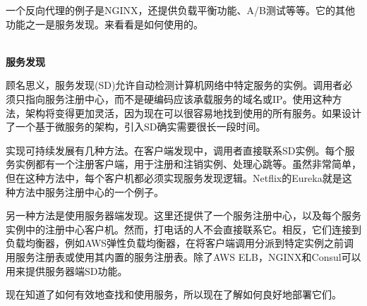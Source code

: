 一个反向代理的例子是NGINX，还提供负载平衡功能、A/B测试等等。它的其他功能之一是服务发现。来看看是如何使用的。

\hspace*{\fill} \\ %
\noindent
\textbf{服务发现}

顾名思义，服务发现(SD)允许自动检测计算机网络中特定服务的实例。调用者必须只指向服务注册中心，而不是硬编码应该承载服务的域名或IP。使用这种方法，架构将变得更加灵活，因为现在可以很容易地找到使用的所有服务。如果设计了一个基于微服务的架构，引入SD确实需要很长一段时间。

实现可持续发展有几种方法。在客户端发现中，调用者直接联系SD实例。每个服务实例都有一个注册客户端，用于注册和注销实例、处理心跳等。虽然非常简单，但在这种方法中，每个客户机都必须实现服务发现逻辑。Netflix的Eureka就是这种方法中服务注册中心的一个例子。

另一种方法是使用服务器端发现。这里还提供了一个服务注册中心，以及每个服务实例中的注册中心客户机。然而，打电话的人不会直接联系它。相反，它们连接到负载均衡器，例如AWS弹性负载均衡器，在将客户端调用分派到特定实例之前调用服务注册表或使用其内置的服务注册表。除了AWS ELB，NGINX和Consul可以用来提供服务器端SD功能。

现在知道了如何有效地查找和使用服务，所以现在了解如何良好地部署它们。






